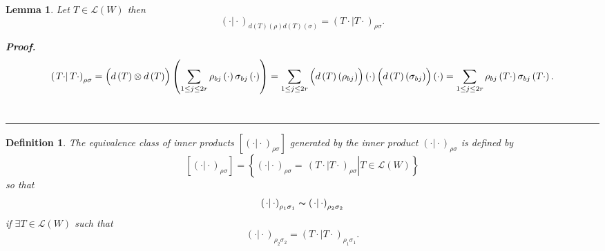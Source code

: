\documentclass[aps,preprint]{revtex4}
\newtheorem{definition}[theorem]{Definition}
\newtheorem{lemma}[theorem]{Lemma}
\newenvironment{proof}[1][Proof]{\noindent\textbf{#1.} }{\ \rule{0.5em}{0.5em}}
\begin{document}
\begin{lemma}
Let $T\in \mathcal{L}\left( W\right) $ then 
\begin{equation}
\left( \left. \cdot \right\vert \cdot \right) _{d\left( T\right) \left( \rho
\right) d\left( T\right) \left( \sigma \right) }=\left( \left. T\cdot
\right\vert T\cdot \right) _{\rho \sigma }.
\end{equation}

\begin{proof}
\begin{equation}
\left( \left. T\cdot \right\vert T\cdot \right) _{\rho \sigma }=\left( 
\overset{}{d\left( T\right) \otimes d\left( T\right) }\right) \left(
\sum_{1\leq j\leq 2r}\rho _{bj}\left( \cdot \right) \sigma _{bj}\left( \cdot
\right) \right) =\sum_{1\leq j\leq 2r}\left( \overset{}{d\left( T\right)
\left( \rho _{bj}\right) }\right) \left( \cdot \right) \left( \overset{}{%
d\left( T\right) \left( \sigma _{bj}\right) }\right) \left( \cdot \right)
=\sum_{1\leq j\leq 2r}\rho _{bj}\left( T\cdot \right) \sigma _{bj}\left(
T\cdot \right) .
\end{equation}
\end{proof}
\end{lemma}

\begin{definition}
The equivalence class of inner products $\left[ \left( \left. \cdot
\right\vert \cdot \right) _{\rho \sigma }\right] $ generated by the inner
product $\left( \left. \cdot \right\vert \cdot \right) _{\rho \sigma }$ is
defined by 
\begin{equation}
\left[ \left( \left. \cdot \right\vert \cdot \right) _{\rho \sigma }\right]
=\left\{ \left. \left( \left. \cdot \right\vert \cdot \right) _{\rho \sigma
}=\,\overset{}{\left( \left. T\cdot \right\vert T\cdot \right) _{\rho \sigma
}}\right\vert T\in \mathcal{L}\left( W\right) \right\}
\end{equation}%
so that 
\begin{equation}
\left( \left. \cdot \right\vert \cdot \right) _{\rho _{1}\sigma
_{1}}\thicksim \left( \left. \cdot \right\vert \cdot \right) _{\rho
_{2}\sigma _{2}}
\end{equation}%
if $\exists T\in \mathcal{L}\left( W\right) $ such that 
\begin{equation}
\left( \left. \cdot \right\vert \cdot \right) _{\rho _{2}\sigma _{2}}=\left(
\left. T\cdot \right\vert T\cdot \right) _{\rho _{1}\sigma _{1}}.
\end{equation}
\end{definition}
\end{document}
